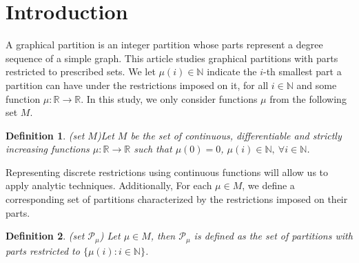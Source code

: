 \documentclass[pdflatex,sn-mathphys-num]{sn-jnl}%
\theoremstyle{thmstyleone}%
\theoremstyle{thmstyletwo}%
\theoremstyle{thmstylethree}%
\newtheorem{definition}{Definition}%
\theoremstyle{thmstylethree}%
\theoremstyle{thmstylethree}%
\begin{document}
\section{Introduction}\label{sec1}
A graphical partition is an integer partition whose parts represent a degree sequence of a simple graph. This article studies graphical partitions with parts restricted to prescribed sets. We let $\mu(i)\in\mathbb{N}$ indicate the $i$-th smallest part a partition can have under the restrictions imposed on it, for all $i\in\mathbb{N}$ and some function $\mu:\mathbb{R}\to\mathbb{R}$. In this study, we only consider functions $\mu$ from the following set $M$.
\begin{definition}(set $M$)\label{def1}
     Let $M$ be the set of continuous, differentiable and strictly increasing functions $\mu:\mathbb{R}\to\mathbb{R}$ such that $\mu(0)=0$, $\mu(i)\in\mathbb{N}, \ \forall i\in\mathbb{N}$. 
\end{definition}
Representing discrete restrictions using continuous functions will allow us to apply analytic techniques. Additionally, For each $\mu \in M$, we define a corresponding set of partitions characterized by the restrictions imposed on their parts.
\begin{definition}(set $\mathcal{P}_\mu$)
    Let $\mu\in M$, then $\mathcal{P}_\mu$ is defined as the set of partitions with parts restricted to $\{\mu(i):i\in\mathbb{N}\}$.
\end{definition}

\newpage
\end{document}

